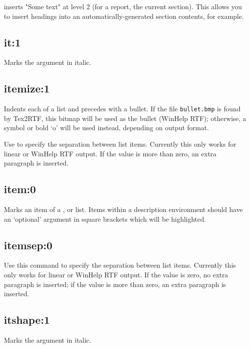 inserts "Some text" at level 2 (for a report, the current section). This
allows you to insert headings into an automatically-generated section contents,
for example.

\subsection*{it:1}\label{it}

Marks the argument in italic.

\subsection*{itemize:1}\label{itemize}

Indents each  of a list and precedes with a bullet.
If the file {\tt bullet.bmp} is found by Tex2RTF, this bitmap will be
used as the bullet (WinHelp RTF); otherwise, a symbol or bold `o' will be used instead,
depending on output format.

Use  to specify the separation between
list items. Currently this only works for linear or WinHelp RTF output.
If the value is more than zero, an extra paragraph is inserted.

\subsection*{item:0}\label{item}

Marks an item of a ,  or 
list. Items within a description environment should have an `optional' argument
in square brackets which will be highlighted.

\subsection*{itemsep:0}\label{itemsep}

Use this command to specify the separation between
list items. Currently this only works for linear or WinHelp RTF output.
If the value is zero, no extra paragraph is inserted; if the value
is more than zero, an extra paragraph is inserted.

\subsection*{itshape:1}\label{itshape}

Marks the argument in italic.

